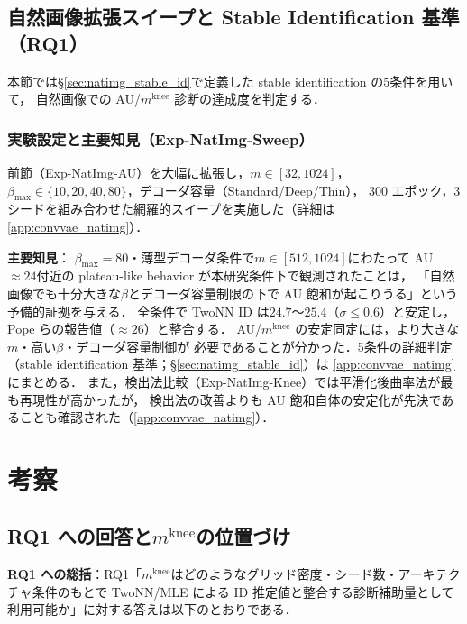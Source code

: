 \documentclass[11pt,a4paper]{jsarticle}
\newcommand{\mknee}{m^{\mathrm{knee}}}
\begin{document}
\subsection{自然画像拡張スイープと Stable Identification 基準（RQ1）}\label{sec:exp_natimg_sweep}

本節では§\ref{sec:natimg_stable_id}で定義した stable identification の5条件を用いて，
自然画像での AU/$\mknee$ 診断の達成度を判定する．

\subsubsection*{実験設定と主要知見（Exp-NatImg-Sweep）}

前節（Exp-NatImg-AU）を大幅に拡張し，$m \in [32, 1024]$，
$\beta_{\max} \in \{10,20,40,80\}$，デコーダ容量（Standard/Deep/Thin），
300 エポック，3シードを組み合わせた網羅的スイープを実施した（詳細は\ref{app:convvae_natimg}）．

\textbf{主要知見}：
$\beta_{\max}=80$・薄型デコーダ条件で$m \in [512, 1024]$にわたって AU$\approx 24$付近の
plateau-like behavior が本研究条件下で観測されたことは，
「自然画像でも十分大きな$\beta$とデコーダ容量制限の下で AU 飽和が起こりうる」という
予備的証拠を与える．
全条件で TwoNN ID は$24.7$〜$25.4$（$\sigma \leq 0.6$）と安定し，
Pope ら\cite{pope2021intrinsic}の報告値（$\approx 26$）と整合する．
AU/$\mknee$ の安定同定には，より大きな$m$・高い$\beta$・デコーダ容量制御が
必要であることが分かった．5条件の詳細判定（stable identification 基準；§\ref{sec:natimg_stable_id}）は
\ref{app:convvae_natimg}にまとめる．
また，検出法比較（Exp-NatImg-Knee）では平滑化後曲率法が最も再現性が高かったが，
検出法の改善よりも AU 飽和自体の安定化が先決であることも確認された（\ref{app:convvae_natimg}）．

\section{考察}\label{sec:discussion}

\subsection{RQ1 への回答と$\mknee$の位置づけ}\label{sec:disc_mknee}

\textbf{RQ1 への総括}：RQ1「$\mknee$はどのようなグリッド密度・シード数・アーキテクチャ条件のもとで
TwoNN/MLE による ID 推定値と整合する診断補助量として利用可能か」に対する答えは以下のとおりである．
\end{document}
